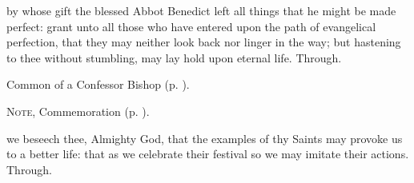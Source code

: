 \clearpage
{}

\memorialCollect
{} by whose gift the blessed Abbot Benedict left all things that he might be made perfect: grant unto all those who have entered upon the path of evangelical perfection, that they may neither look back nor linger in the way; but hastening to thee without stumbling, may lay hold upon eternal life. Through.



\begin{rubric}
	Common of a Confessor Bishop (p. \pageref{CommonConfessorBishop}).
\end{rubric}

\begin{rubric}
	\textsc{Note,} Commemoration  (p. \pageref{FelixCollect}).
\end{rubric}




\memorialCollect\label{FelixCollect}
 we beseech thee, Almighty God, that the examples of thy Saints may provoke us to a better life: that as we celebrate their festival so we may imitate their actions. Through.



